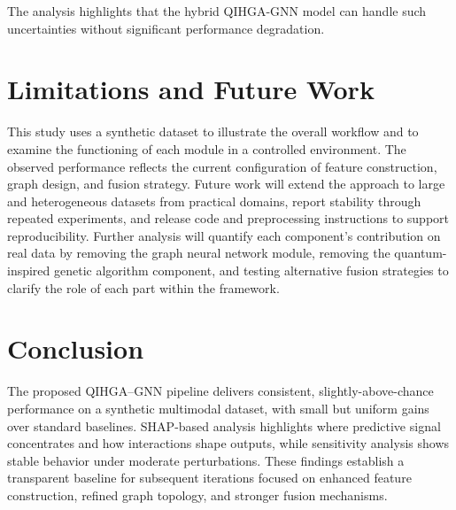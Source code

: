 \documentclass[11pt,a4paper]{article}
\begin{document}
The analysis highlights that the hybrid QIHGA-GNN model can handle such uncertainties without significant performance degradation.

\section{Limitations and Future Work}
This study uses a synthetic dataset to illustrate the overall workflow and to examine the functioning of each module in a controlled environment. The observed performance reflects the current configuration of feature construction, graph design, and fusion strategy. Future work will extend the approach to large and heterogeneous datasets from practical domains, report stability through repeated experiments, and release code and preprocessing instructions to support reproducibility. Further analysis will quantify each component's contribution on real data by removing the graph neural network module, removing the quantum-inspired genetic algorithm component, and testing alternative fusion strategies to clarify the role of each part within the framework.

\section{Conclusion}
The proposed QIHGA--GNN pipeline delivers consistent, slightly-above-chance performance on a synthetic multimodal dataset, with small but uniform gains over standard baselines. SHAP-based analysis highlights where predictive signal concentrates and how interactions shape outputs, while sensitivity analysis shows stable behavior under moderate perturbations. These findings establish a transparent baseline for subsequent iterations focused on enhanced feature construction, refined graph topology, and stronger fusion mechanisms.
\end{document}
